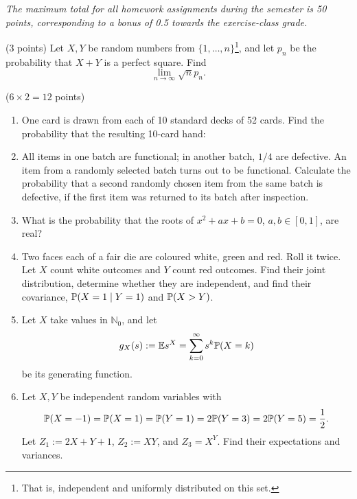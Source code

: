 \documentclass[11pt,a4paper]{article}
\begin{document}
\emph{The maximum total for all homework assignments during the semester is 50 points,
corresponding to a bonus of 0.5 towards the exercise-class grade.}
\begin{problem}
(3 points) Let $X,Y$ be random numbers from $\{1,\ldots,n\}$\footnote{That is,
independent and uniformly distributed on this set.}, and let $p_n$ be the
probability that $X+Y$ is a perfect square. Find
\[\lim_{n\to\infty}\sqrt n p_n.\]
\end{problem}
\begin{problem}
($6\times2=12$ points)
\begin{enumerate}
\item One card is drawn from each of 10 standard decks of 52 cards. Find the
probability that the resulting 10-card hand:
\item All items in one batch are functional; in another batch, $1/4$ are defective.
An item from a randomly selected batch turns out to be functional. Calculate the
probability that a second randomly chosen item from the same batch is defective,
if the first item was returned to its batch after inspection.
\item What is the probability that the roots of $x^2+ax+b=0$, $a,b\in[0,1]$, are real?
\item Two faces each of a fair die are coloured white, green and red. Roll it twice.
Let $X$ count white outcomes and $Y$ count red outcomes. Find their joint
distribution, determine whether they are independent, and find their covariance,
$\P(X=1\mid Y=1)$ and $\P(X>Y)$.
\item Let $X$ take values in $\mathbb N_0$, and let
\[g_X(s):=\E s^X=\sum_{k=0}^\infty s^k\P(X=k)\]
be its generating function.
\item Let $X,Y$ be independent random variables with
\[\P(X=-1)=\P(X=1)=\P(Y=1)=2\P(Y=3)=2\P(Y=5)=\frac12.\]
Let $Z_1:=2X+Y+1$, $Z_2:=XY$, and $Z_3=X^Y$. Find their expectations and variances.
\end{enumerate}
\end{problem}
\end{document}
